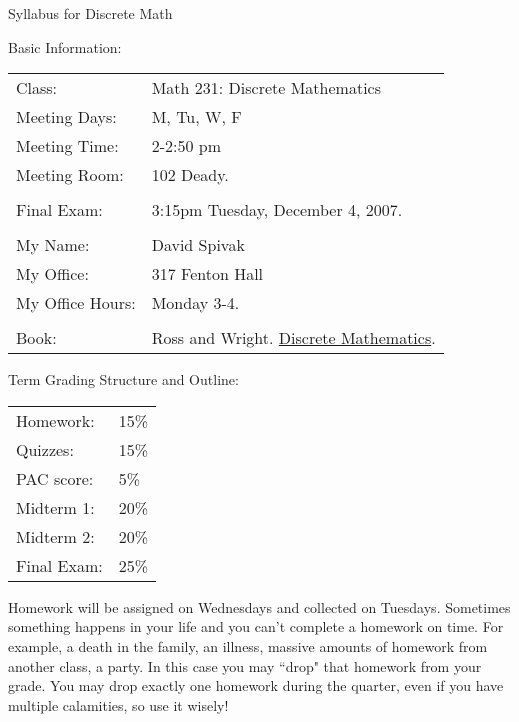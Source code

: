 \documentclass[12pt]{letter}
\begin{document}
\begin{center}\Large Syllabus for Discrete Math\normalsize\end{center}

\vspace{.7in}

\Large Basic Information:\normalsize\\

\vspace{.1in}

\begin{tabular}{ll}

Class:& Math 231: Discrete Mathematics\\
Meeting Days:& M, Tu, W, F\\
Meeting Time:& 2-2:50 pm\\
Meeting Room:& 102 Deady.\\
&\\
Final Exam:& 3:15pm Tuesday, December 4, 2007.\\
&\\
My Name:&David Spivak\\
My Office:&317 Fenton Hall\\
My Office Hours:& Monday 3-4.\\
&\\
Book: &Ross and Wright.  \underline{Discrete Mathematics}.\\

\end{tabular}

\vspace{.2in}

\Large Term Grading Structure and Outline:\normalsize\\

\vspace{.1in}

\begin{tabular}{ll}

Homework:&15\%\\
Quizzes:&15\%\\
PAC score:&5\%\\
Midterm 1:&20\%\\
Midterm 2:&20\%\\
Final Exam:&25\%\\

\end{tabular}

\vspace{.1in}

Homework will be assigned on Wednesdays and collected on Tuesdays.  
Sometimes something happens in your life and you can't complete a homework 
on time.  For example, a death in the family, an illness, massive amounts 
of homework from another class, a party.  In this case you may ``drop" 
that homework from your grade.  You may drop exactly one homework during 
the quarter, even if you have multiple calamities, so use it wisely!
\end{document}
